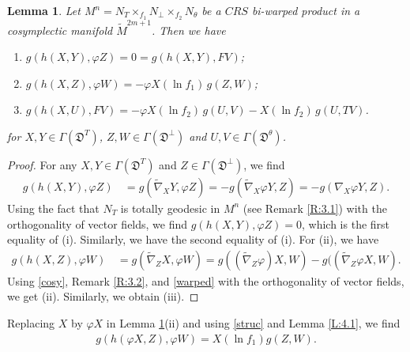 \documentclass[reqno]{amsart}
\theoremstyle{plain}
\newtheorem{lemma}{Lemma}[section]
\theoremstyle{remark}
\numberwithin{equation}{section}
\begin{document}
\begin{lemma}\label{L:4.2} Let $M^n=N_T\times_{f_1}N_\perp\times_{f_2}N_\theta$ be a $CRS$ bi-warped product in a cosymplectic manifold $\widetilde M^{2m+1}$. Then we have
\begin{enumerate}
\item[(i)] $g(h(X, Y), \varphi Z)=0=g(h(X, Y),FV)$;
\item [(ii)] $g(h(X, Z), \varphi W)=-\varphi X(\ln f_1)\,g(Z, W)$;
\item[(iii)] $g(h(X,U), FV)=-\varphi X(\ln f_2)\,g(U, V)-X(\ln f_2)\,g(U, TV)$.
\end{enumerate}
for $X,Y\in \Gamma({\mathfrak{D}^{T}})$, $Z,W\in \Gamma({\mathfrak{D}}^\perp)$ and  $U,V\in \Gamma({\mathfrak{D}}^\theta)$.
\end{lemma}
\begin{proof}
For any $X, Y\in \Gamma({\mathfrak{D}^{T}})$ and $Z\in \Gamma({\mathfrak{D}}^\perp)$, we find
\begin{align*}
g(h(X, Y), \varphi Z)\, &=g(\widetilde\nabla_XY, \varphi Z)=-g(\widetilde\nabla_X\varphi Y, Z)=-g(\nabla_X\varphi Y, Z).
\end{align*}
Using the fact that $N_T$ is totally geodesic in $M^n$ (see Remark \ref{R:3.1}) with the orthogonality of vector fields, we find $g(h(X, Y), \varphi Z)=0$, which is the first equality of (i). Similarly, we have the second equality of (i). 
For (ii), we have
\begin{align*}
g(h(X, Z), \varphi W)\, &=g(\widetilde\nabla_ZX, \varphi W)=g((\widetilde\nabla_Z\varphi)X, W)-g((\widetilde\nabla_Z\varphi X, W).
\end{align*}
Using \eqref{cosy}, Remark \ref{R:3.2}, and \eqref{warped} with the orthogonality of vector fields, we get (ii). Similarly, we obtain (iii).  \end{proof}

Replacing $X$ by $\varphi X$  in Lemma \ref{L:4.2}(ii) and using \eqref{struc} and  Lemma \ref{L:4.1}, we find
 \begin{align}\label{4.1}
g(h(\varphi X, Z), \varphi W)=X(\ln f_1)g(Z, W).
\end{align}
\end{document}
